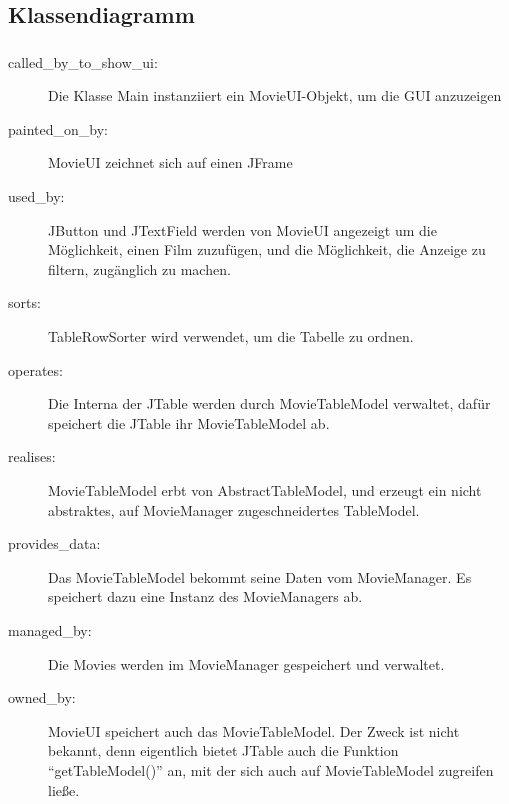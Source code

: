 \documentclass[ngerman]{scrartcl}
\title{\mytitle}
\author{\myauthor}
\newcommand{\blattnummer}{7}												%
\begin{document}
	\setcounter{section}{\blattnummer}
	\subsection{Klassendiagramm}
	\setcounter{subsubsection}{2}
	\subsubsection{}

	\begin{description}
		\item [called\_by\_to\_show\_ui:] Die Klasse Main instanziiert ein MovieUI-Objekt, um die GUI anzuzeigen
		\item [painted\_on\_by:] MovieUI zeichnet sich auf einen JFrame
		\item [used\_by:] JButton und JTextField werden von MovieUI angezeigt um die Möglichkeit, einen Film zuzufügen, und die Möglichkeit, die Anzeige zu filtern, zugänglich zu machen.
		\item [sorts:] TableRowSorter wird verwendet, um die Tabelle zu ordnen.
		\item [operates:] Die Interna der JTable werden durch MovieTableModel verwaltet, dafür speichert die JTable ihr MovieTableModel ab.
		\item [realises:] MovieTableModel erbt von AbstractTableModel, und erzeugt ein nicht abstraktes, auf MovieManager zugeschneidertes TableModel.
		\item [provides\_data:] Das MovieTableModel bekommt seine Daten vom MovieManager. Es speichert dazu eine Instanz des MovieManagers ab.
		\item [managed\_by:] Die Movies werden im MovieManager gespeichert und verwaltet.
		\item [owned\_by:] MovieUI speichert auch das MovieTableModel. Der Zweck ist nicht bekannt, denn eigentlich bietet JTable auch die Funktion "`getTableModel()"' an, mit der sich auch auf MovieTableModel zugreifen ließe.
	\end{description}
\end{document}
